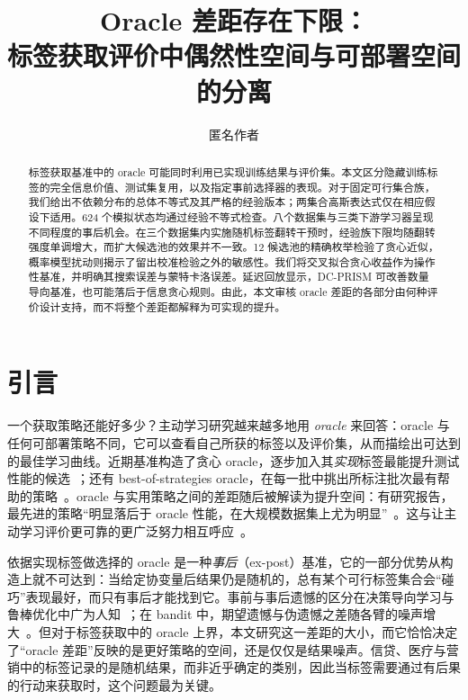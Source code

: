 \documentclass[runningheads]{llncs}
\begin{document}
\title{Oracle 差距存在下限：\\标签获取评价中偶然性空间与可部署空间的分离}
\author{匿名作者}
\maketitle
\begin{abstract}
标签获取基准中的 oracle 可能同时利用已实现训练结果与评价集。本文区分隐藏训练标签的完全信息价值、测试集复用，以及指定事前选择器的表现。对于固定可行集合族，我们给出不依赖分布的总体不等式及其严格的经验版本；两集合高斯表达式仅在相应假设下适用。624 个模拟状态均通过经验不等式检查。八个数据集与三类下游学习器呈现不同程度的事后机会。在三个数据集内实施随机标签翻转干预时，经验族下限均随翻转强度单调增大，而扩大候选池的效果并不一致。12 候选池的精确枚举检验了贪心近似，概率模型扰动则揭示了留出校准检验之外的敏感性。我们将交叉拟合贪心收益作为操作性基准，并明确其搜索误差与蒙特卡洛误差。延迟回放显示，DC-PRISM 可改善数量导向基准，也可能落后于信息贪心规则。由此，本文审核 oracle 差距的各部分由何种评价设计支持，而不将整个差距都解释为可实现的提升。
\end{abstract}

\section{引言}
\label{sec:intro}
一个获取策略还能好多少？主动学习研究越来越多地用 \emph{oracle} 来回答：oracle 与任何可部署策略不同，它可以查看自己所获的标签以及评价集，从而描绘出可达到的最佳学习曲线。近期基准构造了贪心 oracle，逐步加入其\emph{实现}标签最能提升测试性能的候选~\cite{werner2023comparable,werner2024cdalbench}；还有 best-of-strategies oracle，在每一批中挑出所标注批次最有帮助的策略~\cite{huseljic2026boss}。oracle 与实用策略之间的差距随后被解读为提升空间：有研究报告，最先进的策略“明显落后于 oracle 性能，在大规模数据集上尤为明显”~\cite{huseljic2026boss}。这与让主动学习评价更可靠的更广泛努力相互呼应~\cite{luth2023navigating,ji2023randomness}。

依据实现标签做选择的 oracle 是一种\emph{事后}（ex-post）基准，它的一部分优势从构造上就不可达到：当给定协变量后结果仍是随机的，总有某个可行标签集合会“碰巧”表现最好，而只有事后才能找到它。事前与事后遗憾的区分在决策导向学习与鲁棒优化中广为人知~\cite{schutte2023robust}；在 bandit 中，期望遗憾与伪遗憾之差随各臂的噪声增大~\cite{bubeck2012regret,audibert2010regret}。但对于标签获取中的 oracle 上界，本文研究这一差距的大小，而它恰恰决定了“oracle 差距”反映的是更好策略的空间，还是仅仅是结果噪声。信贷、医疗与营销中的标签记录的是随机结果，而非近乎确定的类别，因此当标签需要通过有后果的行动来获取时，这个问题最为关键。
\end{document}
